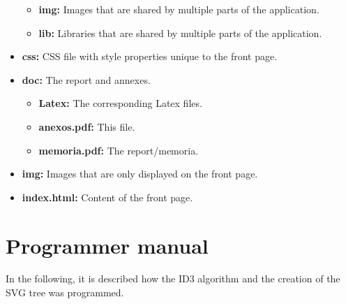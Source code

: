 \begin{itemize}
\begin{itemize}
        \item \textbf{img:} Images that are shared by multiple parts of the application.
        \item \textbf{lib:} Libraries that are shared by multiple parts of the application.
    \end{itemize}
    \item \textbf{css:} CSS file with style properties unique to the front page.
    \item \textbf{doc:} The report and annexes.
    \begin{itemize}
        \item \textbf{Latex:} The corresponding Latex files.
        \item \textbf{anexos.pdf:} This file.
        \item \textbf{memoria.pdf:} The report/memoria.
    \end{itemize}
    \item \textbf{img:} Images that are only displayed on the front page.
    \item \textbf{index.html:} Content of the front page.
\end{itemize}

\section{Programmer manual}
In the following, it is described how the ID3 algorithm and the creation of the SVG tree was programmed.

